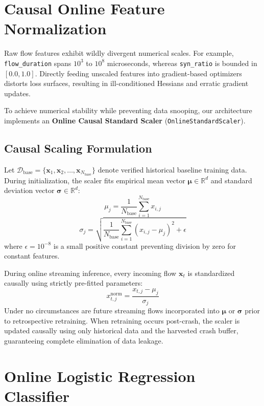 \documentclass[12pt,a4paper,oneside]{report}
\begin{document}
\section{Causal Online Feature Normalization}
Raw flow features exhibit wildly divergent numerical scales. For example, \texttt{flow\_duration} spans $10^3$ to $10^8$ microseconds, whereas \texttt{syn\_ratio} is bounded in $[0.0, 1.0]$. Directly feeding unscaled features into gradient-based optimizers distorts loss surfaces, resulting in ill-conditioned Hessians and erratic gradient updates.

To achieve numerical stability while preventing data snooping, our architecture implements an \textbf{Online Causal Standard Scaler} (\texttt{OnlineStandardScaler}).

\subsection{Causal Scaling Formulation}
Let $\mathcal{D}_{\text{base}} = \{\mathbf{x}_1, \mathbf{x}_2, \dots, \mathbf{x}_{N_{\text{base}}}\}$ denote verified historical baseline training data. During initialization, the scaler fits empirical mean vector $\boldsymbol{\mu} \in \mathbb{R}^d$ and standard deviation vector $\boldsymbol{\sigma} \in \mathbb{R}^d$:
\begin{equation}
\mu_j = \frac{1}{N_{\text{base}}} \sum_{i=1}^{N_{\text{base}}} x_{i,j}
\end{equation}
\begin{equation}
\sigma_j = \sqrt{ \frac{1}{N_{\text{base}}} \sum_{i=1}^{N_{\text{base}}} (x_{i,j} - \mu_j)^2 + \epsilon }
\end{equation}
where $\epsilon = 10^{-8}$ is a small positive constant preventing division by zero for constant features.

During online streaming inference, every incoming flow $\mathbf{x}_t$ is standardized causally using strictly pre-fitted parameters:
\begin{equation}
x_{t,j}^{\text{norm}} = \frac{x_{t,j} - \mu_j}{\sigma_j}
\end{equation}
Under no circumstances are future streaming flows incorporated into $\boldsymbol{\mu}$ or $\boldsymbol{\sigma}$ prior to retrospective retraining. When retraining occurs post-crash, the scaler is updated causally using only historical data and the harvested crash buffer, guaranteeing complete elimination of data leakage.

\section{Online Logistic Regression Classifier}
\end{document}
